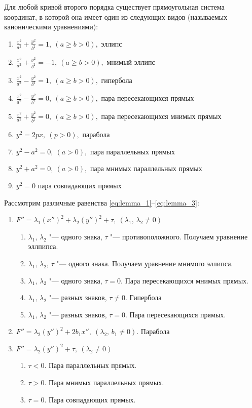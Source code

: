 \begin{theorem}
  \label{theorem:second}
  Для любой кривой второго порядка существует прямоугольная система координат, в которой она имеет один из следующих видов (называемых каноническими уравнениями):
  \begin{enumerate}
    \item $\frac{x^2}{a^2} + \frac{y^2}{b^2} = 1, ~(a \geq b > 0),$ эллипс 
    \item  $\frac{x^2}{a^2} + \frac{y^2}{b^2} = -1, ~(a \geq b > 0),$ мнимый эллипс 
    \item  $\frac{x^2}{a^2} - \frac{y^2}{b^2} = 1, ~(a \geq b > 0),$ гипербола
    \item  $\frac{x^2}{a^2} - \frac{y^2}{b^2} = 0, ~(a \geq b > 0),$ пара пересекающихся прямых
    \item $\frac{x^2}{a^2} + \frac{y^2}{b^2} = 0, ~(a \geq b > 0),$ пара пересекающихся мнимых прямых 
    \item $y^2 = 2px, ~ (p > 0),$ парабола
    \item $y^2 - a^2 = 0, ~ (a > 0),$ пара параллельных прямых
    \item $y^2 + a^2 = 0, ~ (a > 0),$ пара мнимых параллельных прямых
    \item $y^2 = 0$ пара совпадающих прямых
  \end{enumerate}
\end{theorem}

Рассмотрим различные равенства \ref{eq:lemma_1}--\ref{eq:lemma_3}:
\begin{enumerate}
  \item $F'' = \lambda_1(x'')^2 + \lambda_2(y'')^2 + \tau, ~ (\lambda_1,\, \lambda_2 \neq 0)$
  \begin{enumerate}[label = \alph*)]
    \item $\lambda_1, \, \lambda_2$ "--- одного знака, $\tau$ "--- противоположного. Получаем уравнение эллпипса.
    \item $\lambda_1, \, \lambda_2, \, \tau$ "--- одного знака. Получаем уравнение мнимого эллипса.
    \item $\lambda_1, \, \lambda_2$ "--- одного знака, $\tau = 0$. Пара пересекающихся мнимых прямых.
    \item $\lambda_1, \, \lambda_2$ "--- разных знаков, $\tau \neq 0$. Гипербола
    \item $\lambda_1, \, \lambda_2$ "--- разных знаков, $\tau = 0$. Пара пересекающихся прямых.
  \end{enumerate}
  \item $F'' = \lambda_2(y'')^2 + 2b_1x'', ~ (\lambda_2, \, b_1 \neq 0)$. Парабола
  \item $ F'' = \lambda_2(y'')^2 + \tau, ~ (\lambda_2 \neq 0)$
  \begin{enumerate}[label = \alph*)]
    \item $\tau < 0$. Пара параллельных прямых.
    \item $\tau > 0$. Пара мнимых параллельных прямых.
    \item $\tau = 0$. Пара совпадающих прямых.
  \end{enumerate}
\end{enumerate}

